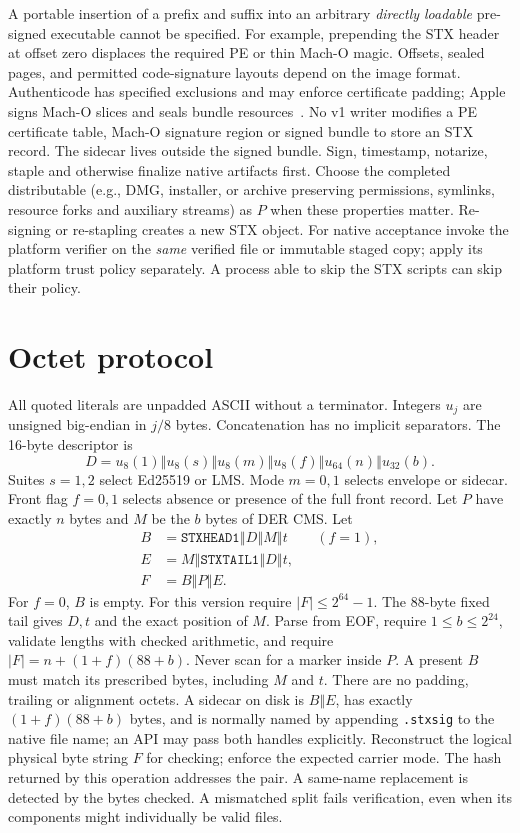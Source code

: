\documentclass[10pt,twocolumn,letterpaper]{article}
\newcommand{\cat}{\mathbin\Vert}
\begin{document}
A portable insertion of a prefix and suffix into an arbitrary \emph{directly loadable} pre-signed executable cannot be specified. For example, prepending the STX header at offset zero displaces the required PE or thin Mach-O magic. Offsets, sealed pages, and permitted code-signature layouts depend on the image format. Authenticode has specified exclusions and may enforce certificate padding; Apple signs Mach-O slices and seals bundle resources~\cite{pe,apple}. No v1 writer modifies a PE certificate table, Mach-O signature region or signed bundle to store an STX record. The sidecar lives outside the signed bundle. Sign, timestamp, notarize, staple and otherwise finalize native artifacts first. Choose the completed distributable (e.g., DMG, installer, or archive preserving permissions, symlinks, resource forks and auxiliary streams) as $P$ when these properties matter. Re-signing or re-stapling creates a new STX object. For native acceptance invoke the platform verifier on the \emph{same} verified file or immutable staged copy; apply its platform trust policy separately. A process able to skip the STX scripts can skip their policy.

\section{Octet protocol}
All quoted literals are unpadded ASCII without a terminator. Integers $u_j$ are unsigned big-endian in $j/8$ bytes. Concatenation has no implicit separators. The 16-byte descriptor is
\[
 D=u_8(1)\cat u_8(s)\cat u_8(m)\cat u_8(f)\cat u_{64}(n)\cat u_{32}(b).
\]
Suites $s=1,2$ select Ed25519 or LMS. Mode $m=0,1$ selects envelope or sidecar. Front flag $f=0,1$ selects absence or presence of the full front record. Let $P$ have exactly $n$ bytes and $M$ be the $b$ bytes of DER CMS. Let
\begin{align*}
 B &= \texttt{STXHEAD1}\cat D\cat M\cat t
           && (f=1),\\
 E &= M\cat\texttt{STXTAIL1}\cat D\cat t,\\
 F &= B\cat P\cat E .
\end{align*}
For $f=0$, $B$ is empty. For this version require $|F|\le 2^{64}-1$. The 88-byte fixed tail gives $D,t$ and the exact position of $M$. Parse from EOF, require $1\le b\le 2^{24}$, validate lengths with checked arithmetic, and require $|F|=n+(1+f)(88+b)$. Never scan for a marker inside $P$. A present $B$ must match its prescribed bytes, including $M$ and $t$. There are no padding, trailing or alignment octets. A sidecar on disk is $B\cat E$, has exactly $(1+f)(88+b)$ bytes, and is normally named by appending \texttt{.stxsig} to the native file name; an API may pass both handles explicitly. Reconstruct the logical physical byte string $F$ for checking; enforce the expected carrier mode. The hash returned by this operation addresses the pair. A same-name replacement is detected by the bytes checked. A mismatched split fails verification, even when its components might individually be valid files.
\end{document}
